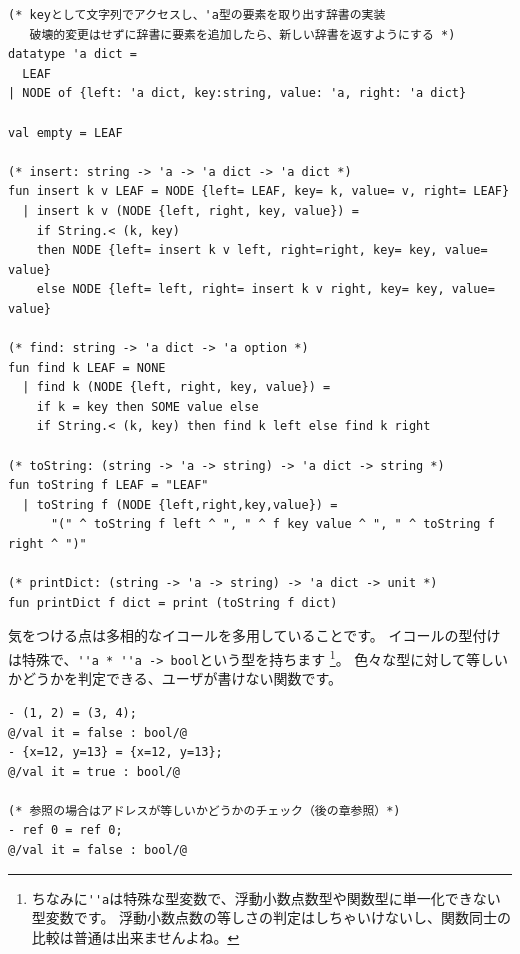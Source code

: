 \documentclass[11pt,a4paper]{article}
\begin{document}
\begin{lstlisting}[caption=２分探索木による辞書の実装,label=code:dict]
(* keyとして文字列でアクセスし、'a型の要素を取り出す辞書の実装
   破壊的変更はせずに辞書に要素を追加したら、新しい辞書を返すようにする *)
datatype 'a dict =
  LEAF
| NODE of {left: 'a dict, key:string, value: 'a, right: 'a dict}

val empty = LEAF

(* insert: string -> 'a -> 'a dict -> 'a dict *)
fun insert k v LEAF = NODE {left= LEAF, key= k, value= v, right= LEAF}
  | insert k v (NODE {left, right, key, value}) =
    if String.< (k, key)
    then NODE {left= insert k v left, right=right, key= key, value= value}
    else NODE {left= left, right= insert k v right, key= key, value= value}

(* find: string -> 'a dict -> 'a option *)
fun find k LEAF = NONE
  | find k (NODE {left, right, key, value}) =
    if k = key then SOME value else
    if String.< (k, key) then find k left else find k right

(* toString: (string -> 'a -> string) -> 'a dict -> string *)
fun toString f LEAF = "LEAF"
  | toString f (NODE {left,right,key,value}) =
      "(" ^ toString f left ^ ", " ^ f key value ^ ", " ^ toString f right ^ ")"

(* printDict: (string -> 'a -> string) -> 'a dict -> unit *)
fun printDict f dict = print (toString f dict)
\end{lstlisting}


気をつける点は多相的なイコールを多用していることです。
イコールの型付けは特殊で、\lstinline{''a * ''a -> bool}という型を持ちます
\footnote{ちなみに\lstinline{''a}は特殊な型変数で、浮動小数点数型や関数型に単一化できない型変数です。
浮動小数点数の等しさの判定はしちゃいけないし、関数同士の比較は普通は出来ませんよね。}。
色々な型に対して等しいかどうかを判定できる、ユーザが書けない関数です。

\begin{lstlisting}[caption=イコールを乱用する,label=code:equal]
- (1, 2) = (3, 4);
@/val it = false : bool/@
- {x=12, y=13} = {x=12, y=13};
@/val it = true : bool/@

(* 参照の場合はアドレスが等しいかどうかのチェック（後の章参照）*)
- ref 0 = ref 0;
@/val it = false : bool/@
\end{lstlisting}
\end{document}
